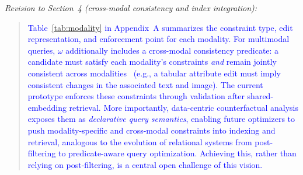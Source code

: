 \noindent\emph{Revision to Section~4 (cross-modal consistency and index integration):}
\begin{quote}
\textcolor{blue}{Table~\ref{tab:modality} in Appendix~A summarizes the constraint type, edit representation, and enforcement point for each modality. For multimodal queries, $\omega$ additionally includes a cross-modal consistency predicate: a candidate must satisfy each modality's constraints \emph{and} remain jointly consistent across modalities~\cite{chen2019cross} (e.g., a tabular attribute edit must imply consistent changes in the associated text and image). The current prototype enforces these constraints through validation after shared-embedding retrieval. More importantly, data-centric counterfactual analysis exposes them as \emph{declarative query semantics}, enabling future optimizers to push modality-specific and cross-modal constraints into indexing and retrieval, analogous to the evolution of relational systems from post-filtering to predicate-aware query optimization. Achieving this, rather than relying on post-filtering, is a central open challenge of this vision.}
\end{quote}
